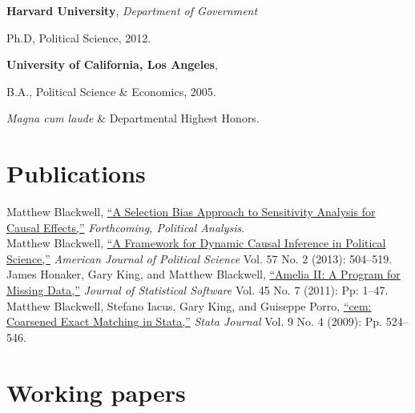 \documentclass[margin,line]{res}
\newenvironment{list1}{
  \begin{list}{\ding{113}}{%
      \setlength{\itemsep}{0in}
      \setlength{\parsep}{0in} \setlength{\parskip}{0in}
      \setlength{\topsep}{0in} \setlength{\partopsep}{0in} 
      \setlength{\leftmargin}{0.83 cm}}}{\end{list}}
\begin{document}
\begin{resume}
{\bf Harvard University}, {\em Department of Government}
\begin{list1}
\item[] Ph.D, Political Science, 2012. 
\end{list1}
{\bf University of California, Los Angeles}, 
\begin{list1}
\item[] B.A., Political Science \& Economics, 2005.
\item[] \emph{Magna cum laude} \& Departmental Highest Honors.
\end{list1}

\section{\sc Publications}
Matthew Blackwell, \href{http://gking.harvard.edu/files/sens.pdf}{``A Selection Bias Approach to Sensitivity
Analysis for Causal Effects,''} \emph{Forthcoming, Political Analysis}.\vspace{1em}\\
Matthew Blackwell,
\href{http://mattblackwell.org/files/papers/dynci.pdf}{``A Framework
  for Dynamic Causal Inference in Political Science,''}
\emph{American Journal of Political Science} Vol. 57 No. 2 (2013): 504--519.\vspace{1em}\\
James Honaker, Gary King, and Matthew Blackwell, \href{http://www.mattblackwell.org/files/papers/amelia-jss.pdf}{``Amelia II: A
Program for Missing Data,''} \emph{Journal of Statistical Software}
Vol. 45 No. 7 (2011): Pp: 1--47.
\vspace{1em}\\
Matthew Blackwell, Stefano Iacus, Gary King, and Guiseppe Porro, \href{http://www.mattblackwell.org/files/papers/cemStata.pdf}{``cem: Coarsened Exact Matching in Stata,''} \emph{Stata
  Journal} Vol. 9 No. 4 (2009): Pp. 524--546.

\section{\sc Working papers}


\end{resume}
\end{document}
